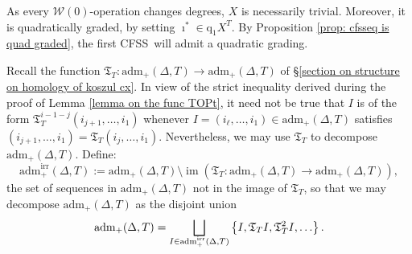 \documentclass[11pt]{amsart} \renewcommand{\baselinestretch}{1.2}
\theoremstyle{plain}
\numberwithin{equation}{section} %
\theoremstyle{plain}
\numberwithin{equation}{chapter} %
\DeclareMathOperator{\im}{im}
\renewcommand{\to}{\longrightarrow}
\newcommand{\calw}{\mathcal{W}}
\newcommand{\quadgrad}[1]{\mathrm{q}_{#1}}
\newcommand{\aDT}{\mathrm{adm}_+(\Delta,T)}
\newcommand{\aDTirr}{\mathrm{adm}_+^\mathrm{irr}(\Delta,T)}
\newcommand{\TOP}{\mathfrak{T}}
\newcommand{\CFSS}{CFSS}
\begin{document}
\begin{Calculations of HWn}
As every $\calw(0)$-operation changes degrees, $X$ is necessarily trivial. Moreover, it is quadratically graded, by setting $\imath^*\in \quadgrad{1}X^T$. By Proposition \ref{prop: cfsseq is quad graded}, the first \CFSS\ will admit a quadratic grading.


Recall the function $\TOP_T:\aDT\to \aDT$ of \S\ref{section on structure on homology of koszul cx}. In view of the strict inequality derived during the proof of Lemma \ref{lemma on the func TOPt}, it need not be true that $I$ is of the form $\TOP_T^{i-1-j}(i_{j+1},\ldots,i_1)$ whenever  $I=(i_\ell,\ldots,i_1)\in \aDT$ satisfies $(i_{j+1},\ldots,i_1)=\TOP_T(i_{j},\ldots,i_1)$. Nevertheless, we may use $\TOP_T$ to decompose $\aDT$.
Define:
\[\aDTirr:= \aDT\setminus\im(\TOP_T:\aDT\to\aDT),\]
the set of sequences in $\aDT$ not in the image of $\TOP_T$, so that we may decompose $\aDT$ as the disjoint union
\[\aDT=\bigsqcup_{\smash{I\in \aDTirr}}\left\{I,\TOP_T I,\TOP_T^2I,\ldots\right\}.\]








\end{Calculations of HWn}
\end{document}
